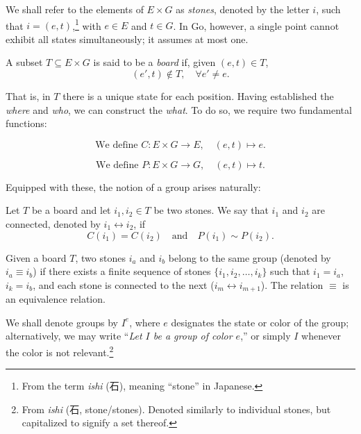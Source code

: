 We shall refer to the elements of \(E \times G\) as \textit{stones}, denoted by the letter \(i\), such that \(i=(e,t)\),\footnote{From the term \textit{ishi} (石), meaning ``stone'' in Japanese.} with \(e \in E\) and \(t \in G\). In Go, however, a single point cannot exhibit all states simultaneously; it assumes at most one.

\begin{definition}[Board]
	A subset \(T \subseteq E \times G\) is said to be a \textit{board} if, given \((e,t) \in T\),
	$$(e',t) \notin T, \quad \forall e' \neq e.$$

\end{definition}

That is, in $T$ there is a unique state for each position. Having established the \textit{where} and \textit{who}, we can construct the \textit{what}. To do so, we require two fundamental functions:

\begin{definition}
	\label{funcioncolor}$$\text{We define } C: E \times G \to E, \quad (e,t) \mapsto e.$$
	\end{definition}
	
\begin{definition}
	\label{funcionposiciion}$$\text{We define } P: E \times G \to G, \quad (e,t) \mapsto t.$$
	\end{definition}
	
Equipped with these, the notion of a group arises naturally:

\begin{definition}[Connection]Let $T$ be a board and let $i_1, i_2 \in T$ be two stones. We say that $i_1$ and $i_2$ are connected, denoted by $i_1 \leftrightarrow i_2$, if
	$$C(i_1) = C(i_2) \quad \text{and} \quad P(i_1) \sim P(i_2).$$
\end{definition}


\begin{definition}
	Given a board $T$, two stones $i_a$ and $i_b$ belong to the same group (denoted by $i_a \equiv i_b$) if there exists a finite sequence of stones $\{i_1, i_2, \dots, i_k\}$ such that $i_1 = i_a$, $i_k = i_b$, and each stone is connected to the next ($i_m \leftrightarrow i_{m+1}$). The relation $\equiv$ is an equivalence relation.
	
	We shall denote groups by \(I^e\), where \(e\) designates the state or color of the group; alternatively, we may write ``\textit{Let \(I\) be a group of color \(e\)},'' or simply \(I\) whenever the color is not relevant.\footnote{From \textit{ishi} (石, stone/stones). Denoted similarly to individual stones, but capitalized to signify a set thereof.}
\end{definition}
	

